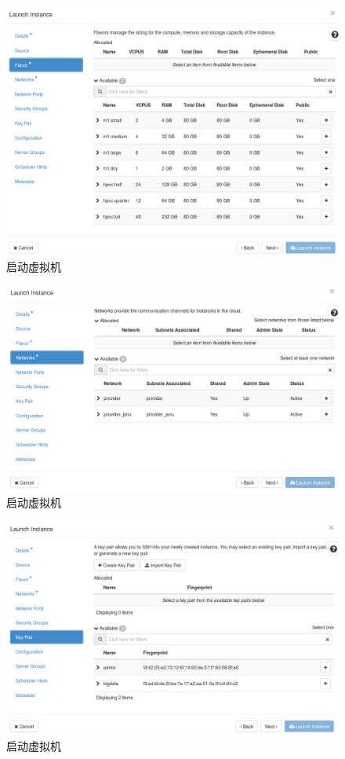 \documentclass[12pt]{ctexart}%
\begin{document}
\begin{figure}[!htb]
\centering
\includegraphics[width=6in]{./figures/LaunchInstanceII}
\caption{启动虚拟机}
\label{fig:launchInstanceII}
\end{figure}
\begin{figure}[!htb]
\centering
\includegraphics[width=6in]{./figures/LaunchInstanceIII}
\caption{启动虚拟机}
\label{fig:launchInstanceIII}
\end{figure}
\begin{figure}[!htb]
\centering
\includegraphics[width=6in]{./figures/LaunchInstanceKey}
\caption{启动虚拟机}
\label{fig:launchInstanceKey}
\end{figure}
\end{document}
